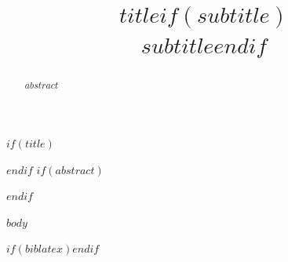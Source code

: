 \documentclass[$if(fontsize)$$fontsize$$else$12pt$endif$, $if(papersize)$$papersize$$else$letterpaper$endif$]{article}
\title{$title$$if(subtitle)$\\\large $subtitle$$endif$}
\begin{document}
$if(title)$\maketitle$endif$
$if(abstract)$
\begin{abstract}
$abstract$
\end{abstract}
$endif$

$body$

$if(biblatex)$\printbibliography$endif$
\end{document}
